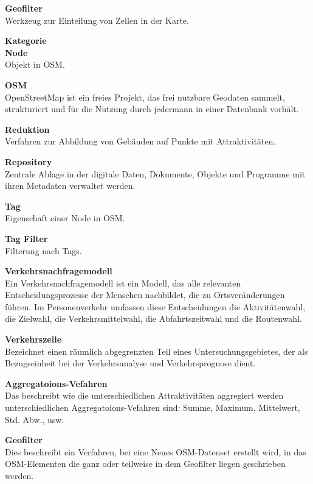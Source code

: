 \documentclass[parskip=full]{scrartcl} %
\begin{document}
\textbf{Geofilter}\\
Werkzeug zur Einteilung von Zellen in der Karte.

\textbf{Kategorie}\\


\textbf{Node}\\
Objekt in OSM.

\textbf{OSM}\\
OpenStreetMap ist ein freies Projekt, das frei nutzbare Geodaten sammelt, strukturiert und für die Nutzung durch jedermann in einer Datenbank vorhält.

\textbf{Reduktion}\\
Verfahren zur Abbildung von Gebäuden auf Punkte mit Attraktivitäten.

\textbf{Repository}\\
Zentrale Ablage in der digitale Daten, Dokumente, Objekte und Programme mit ihren Metadaten verwaltet werden.

\textbf{Tag}\\
Eigenschaft einer Node in OSM.

\textbf{Tag Filter}\\
Filterung nach Tags.

\textbf{Verkehrsnachfragemodell}\\
Ein Verkehrsnachfragemodell ist ein Modell, das alle relevanten Entscheidungsprozesse der Menschen nachbildet, die zu Ortsveränderungen führen. Im Personenverkehr umfassen diese Entscheidungen die Aktivitätenwahl, die Zielwahl, die Verkehrsmittelwahl, die Abfahrtszeitwahl und die Routenwahl.

\textbf{Verkehrszelle}\\
Bezeichnet einen räumlich abgegrenzten Teil eines Untersuchungsgebietes, der als Bezugseinheit bei der Verkehrsanalyse und Verkehrsprognose dient.

\textbf{Aggregatoions-Vefahren}\\
Das beschreibt wie die unterschiedlichen Attraktivitäten aggregiert werden unterschiedlichen Aggregatoions-Vefahren sind: Summe, Maximum, Mittelwert, Std. Abw., usw.

\textbf{Geofilter}\\
Dies beschreibt ein Verfahren, bei eine Neues OSM-Datenset erstellt wird, in das OSM-Elementen die ganz oder teilweise in dem Geofilter liegen geschrieben werden.
\end{document}
